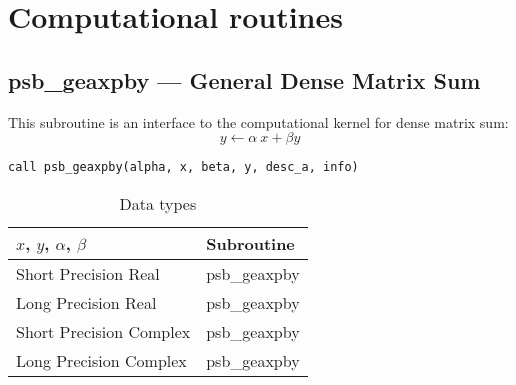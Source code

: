 \section{Computational routines}

%
%
\clearpage\subsection*{psb\_geaxpby --- General Dense Matrix Sum}

This subroutine is an interface to the computational kernel for
dense matrix sum:
\[ y \leftarrow  \alpha\> x+ \beta y \] 

\begin{verbatim}
call psb_geaxpby(alpha, x, beta, y, desc_a, info)
\end{verbatim}

\begin{table}[h]
\begin{center}
\begin{tabular}{ll}
\hline
$x$, $y$, $\alpha$, $\beta$ & {\bf Subroutine}\\
\hline
Short Precision Real & psb\_geaxpby \\
Long Precision Real & psb\_geaxpby \\
Short Precision Complex & psb\_geaxpby \\
Long Precision Complex & psb\_geaxpby \\
\hline
\end{tabular}
\end{center}
\caption{Data types\label{tab:f90axpby}}
\end{table}

